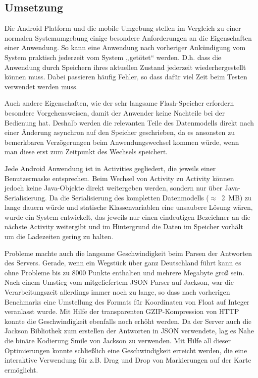 \subsection*{Umsetzung}
Die Android Platform und die mobile Umgebung stellen im Vergleich zu einer normalen Systemumgebung einige besondere Anforderungen an die Eigenschaften einer Anwendung. So kann eine Anwendung nach vorheriger Ankündigung vom System praktisch jederzeit vom System „getötet“ werden. D.h. dass die Anwendung durch Speichern ihres aktuellen Zustand jederzeit wiederhergestellt können muss. Dabei passieren häufig Fehler, so dass dafür viel Zeit beim Testen verwendet werden muss.

Auch andere Eigenschaften, wie der sehr langsame Flash-Speicher erfordern besondere Vorgehensweisen, damit der Anwender keine Nachteile bei der Bedienung hat. Deshalb werden die relevanten Teile des Datenmodells direkt nach einer Änderung asynchron auf den Speicher geschrieben, da es ansonsten zu bemerkbaren Verzögerungen beim Anwendungswechsel kommen würde, wenn man diese erst zum Zeitpunkt des Wechsels speichert.

Jede Android Anwendung ist in Activities gegliedert, die jeweils einer Benutzermaske entsprechen. Beim Wechsel von Activity zu Activity können jedoch keine Java-Objekte direkt weitergeben werden, sondern nur über Java-Serialisierung. Da die Serialisierung des kompletten Datenmodells ($\approx$~2~MB) zu lange dauern würde und statische Klassenvariablen eine unsaubere Lösung wären, wurde ein System entwickelt, das jeweils nur einen eindeutigen Bezeichner an die nächste Activity weitergibt und im Hintergrund die Daten im Speicher vorhält um die Ladezeiten gering zu halten.

Probleme machte auch die langsame Geschwindigkeit beim Parsen der Antworten des Servers. Gerade, wenn ein Wegstück über ganz Deutschland führt kann es ohne Probleme bis zu 8000 Punkte enthalten und mehrere Megabyte groß sein. Nach einem Umstieg vom mitgeliefertem JSON-Parser auf Jackson, war die Verarbeitungszeit allerdings immer noch zu lange, so dass nach vorherigen Benchmarks eine Umstellung des Formats für Koordinaten von Float auf Integer veranlasst wurde. Mit Hilfe der transparenten GZIP-Kompression von HTTP konnte die Geschwindigkeit ebenfalls noch erhöht werden. Da der Server auch die Jackson Bibliothek zum erstellen der Antworten in JSON verwendete, lag es Nahe die binäre Kodierung Smile von Jackson zu verwenden. Mit Hilfe all dieser Optimierungen konnte schließlich eine Geschwindigkeit erreicht werden, die eine interaktive Verwendung für z.B. Drag und Drop von Markierungen auf der Karte ermöglicht.